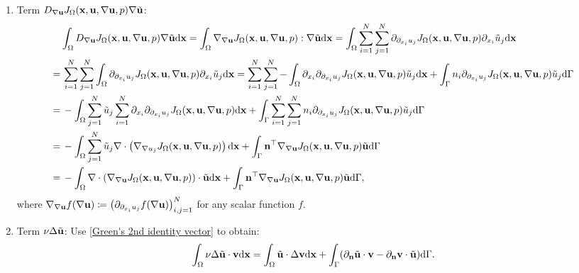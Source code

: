 \documentclass[oneside]{book}
\numberwithin{equation}{section}
\begin{document}
\begin{enumerate}
    \item Term $D_{\nabla{\bf u}}J_\Omega({\bf x},{\bf u},\nabla{\bf u},p)\nabla\tilde{\bf u}$:
    \begin{align*}
        &\int_\Omega D_{\nabla{\bf u}} J_\Omega({\bf x},{\bf u},\nabla{\bf u},p)\nabla\tilde{\bf u}{\rm d}{\bf x} = \int_\Omega \nabla_{\nabla{\bf u}}J_\Omega({\bf x},{\bf u},\nabla{\bf u},p):\nabla\tilde{\bf u}{\rm d}{\bf x} = \int_\Omega \sum_{i=1}^N\sum_{j=1}^N \partial_{\partial_{x_i}u_j}J_\Omega({\bf x},{\bf u},\nabla{\bf u},p)\partial_{x_i}\tilde{u}_j{\rm d}{\bf x}\\
        =&\, \sum_{i=1}^N\sum_{j=1}^N \int_\Omega \partial_{\partial_{x_i}u_j}J_\Omega({\bf x},{\bf u},\nabla{\bf u},p)\partial_{x_i}\tilde{u}_j{\rm d}{\bf x} = \sum_{i=1}^N\sum_{j=1}^N -\int_\Omega \partial_{x_i}\partial_{\partial_{x_i}u_j}J_\Omega({\bf x},{\bf u},\nabla{\bf u},p)\tilde{u}_j{\rm d}{\bf x} + \int_\Gamma n_i\partial_{\partial_{x_i}u_j}J_\Omega({\bf x},{\bf u},\nabla{\bf u},p)\tilde{u}_j{\rm d}\Gamma\\
        =&\, -\int_\Omega \sum_{j=1}^N \tilde{u}_j\sum_{i=1}^N \partial_{x_i}\partial_{\partial_{x_i}u_j}J_\Omega({\bf x},{\bf u},\nabla{\bf u},p){\rm d}{\bf x} + \int_\Gamma \sum_{i=1}^N\sum_{j=1}^N n_i\partial_{\partial_{x_i}u_j}J_\Omega({\bf x},{\bf u},\nabla{\bf u},p)\tilde{u}_j{\rm d}\Gamma\\
        =&\, -\int_\Omega \sum_{j=1}^N \tilde{u}_j\nabla\cdot\left(\nabla_{\nabla u_j}J_\Omega({\bf x},{\bf u},\nabla{\bf u},p)\right){\rm d}{\bf x} + \int_\Gamma {\bf n}^\top\nabla_{\nabla{\bf u}}J_\Omega({\bf x},{\bf u},\nabla{\bf u},p)\tilde{\bf u}{\rm d}\Gamma\\
        =&\, -\int_\Omega \nabla\cdot\left(\nabla_{\nabla{\bf u}}J_\Omega({\bf x},{\bf u},\nabla{\bf u},p)\right)\cdot\tilde{\bf u}{\rm d}{\bf x} + \int_\Gamma {\bf n}^\top\nabla_{\nabla{\bf u}}J_\Omega({\bf x},{\bf u},\nabla{\bf u},p)\tilde{\bf u}{\rm d}\Gamma,
    \end{align*}
    where $\nabla_{\nabla{\bf u}} f(\nabla{\bf u})\coloneqq\left(\partial_{\partial_{x_i}u_j}f(\nabla{\bf u})\right)_{i,j=1}^N$ for any scalar function $f$.
    \item Term $\nu\Delta\tilde{\bf u}$: Use \eqref{Green's 2nd identity vector} to obtain:
    \begin{align*}
        \int_\Omega \nu\Delta\tilde{\bf u}\cdot{\bf v}{\rm d}{\bf x} = \int_\Omega \tilde{\bf u}\cdot\Delta{\bf v}{\rm d}{\bf x} + \int_\Gamma (\partial_{\bf n}\tilde{\bf u}\cdot{\bf v} - \partial_{\bf n}{\bf v}\cdot\tilde{\bf u}){\rm d}\Gamma.

\end{align*}
\end{enumerate}
\end{document}

